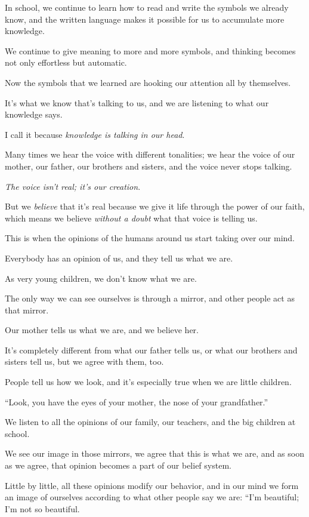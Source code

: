 \documentclass{article}
\numberwithin{equation}{section}
\begin{document}
In school, we continue to learn how to read and write the symbols we already know, and the written language makes it possible for us to accumulate more knowledge.

We continue to give meaning to more and more symbols, and thinking becomes not only effortless but automatic.

%
Now the symbols that we learned are hooking our attention all by themselves.

It's what we know that's talking to us, and we are listening to what our knowledge says.

I call it  because \textit{knowledge is talking in our head}.

Many times we hear the voice with different tonalities; we hear the voice of our mother, our father, our brothers and sisters, and the voice never stops talking.

\textit{The voice isn't real; it's our creation}.

But we \textit{believe} that it's real because we give it life through the power of our faith, which means we believe \textit{without a doubt} what that voice is telling us.

This is when the opinions of the humans around us start taking over our mind.

%
Everybody has an opinion of us, and they tell us what we are.

As very young children, we don't know what we are.

The only way we can see ourselves is through a mirror, and other people act as that mirror.

Our mother tells us what we are, and we believe her.

It's completely different from what our father tells us, or what our brothers and sisters tell us, but we agree with them, too.

People tell us how we look, and it's especially true when we are little children.

``Look, you have the eyes of your mother, the nose of your grandfather.''

We listen to all the opinions of our family, our teachers, and the big children at school.

We see our image in those mirrors, we agree that this is what we are, and as soon as we agree, that opinion becomes a part of our belief system.

Little by little, all these opinions modify our behavior, and in our mind we form an image of ourselves according to what other people say we are: ``I'm beautiful; I'm not so beautiful.
\end{document}
